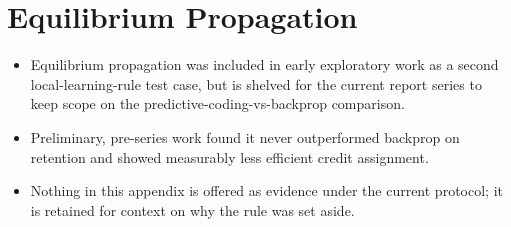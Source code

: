 \section{Equilibrium Propagation}
\begin{itemize}
    \item Equilibrium propagation was included in early exploratory work as a second local-learning-rule test case, but is shelved for the current report series to keep scope on the predictive-coding-vs-backprop comparison.
    \item Preliminary, pre-series work found it never outperformed backprop on retention and showed measurably less efficient credit assignment.
    \item Nothing in this appendix is offered as evidence under the current protocol; it is retained for context on why the rule was set aside.
\end{itemize}
